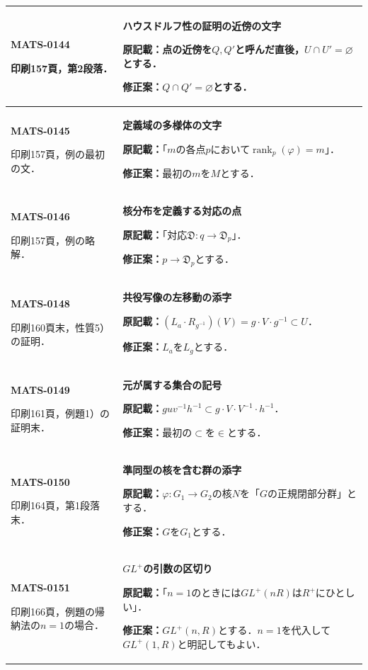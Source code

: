 \documentclass[a4paper,10pt]{ltjsarticle}
\begin{document}
\begin{longtable}{@{}>{\raggedright\arraybackslash}p{.19\linewidth}>{\raggedright\arraybackslash}p{.77\linewidth}@{}}
\hline
\hypertarget{MATS-0144}{}\textbf{MATS-0144}\par 印刷157頁，第2段落． & \textbf{ハウスドルフ性の証明の近傍の文字}\par\textbf{原記載：}点の近傍を$Q,Q'$と呼んだ直後，$U\cap U'=\varnothing$とする．\par\textbf{修正案：}$Q\cap Q'=\varnothing$とする． \\[3pt]
\hline
\hypertarget{MATS-0145}{}\textbf{MATS-0145}\par 印刷157頁，例の最初の文． & \textbf{定義域の多様体の文字}\par\textbf{原記載：}「$m$の各点$p$において$\operatorname{rank}_p(\varphi)=m$」．\par\textbf{修正案：}最初の$m$を$M$とする． \\[3pt]
\hline
\hypertarget{MATS-0146}{}\textbf{MATS-0146}\par 印刷157頁，例の略解． & \textbf{核分布を定義する対応の点}\par\textbf{原記載：}「対応$\mathfrak D:q\to\mathfrak D_p$」．\par\textbf{修正案：}$p\to\mathfrak D_p$とする． \\[3pt]
\hline
\hypertarget{MATS-0148}{}\textbf{MATS-0148}\par 印刷160頁末，性質5）の証明． & \textbf{共役写像の左移動の添字}\par\textbf{原記載：}$(L_a\cdot R_{g^{-1}})(V)=g\cdot V\cdot g^{-1}\subset U$．\par\textbf{修正案：}$L_a$を$L_g$とする． \\[3pt]
\hline
\hypertarget{MATS-0149}{}\textbf{MATS-0149}\par 印刷161頁，例題1）の証明末． & \textbf{元が属する集合の記号}\par\textbf{原記載：}$guv^{-1}h^{-1}\subset g\cdot V\cdot V^{-1}\cdot h^{-1}$．\par\textbf{修正案：}最初の$\subset$を$\in$とする． \\[3pt]
\hline
\hypertarget{MATS-0150}{}\textbf{MATS-0150}\par 印刷164頁，第1段落末． & \textbf{準同型の核を含む群の添字}\par\textbf{原記載：}$\varphi:G_1\to G_2$の核$N$を「$G$の正規閉部分群」とする．\par\textbf{修正案：}$G$を$G_1$とする． \\[3pt]
\hline
\hypertarget{MATS-0151}{}\textbf{MATS-0151}\par 印刷166頁，例題の帰納法の$n=1$の場合． & \textbf{$GL^+$の引数の区切り}\par\textbf{原記載：}「$n=1$のときには$GL^+(nR)$は$R^+$にひとしい」．\par\textbf{修正案：}$GL^+(n,R)$とする．$n=1$を代入して$GL^+(1,R)$と明記してもよい． \\[3pt]

\end{longtable}
\end{document}
